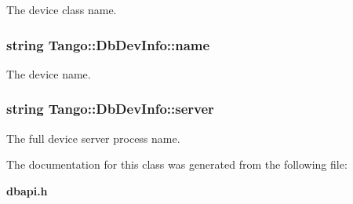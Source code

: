 The device class name. 

\subsubsection[{name}]{\setlength{\rightskip}{0pt plus 5cm}string Tango\-::\-Db\-Dev\-Info\-::name}\label{classTango_1_1DbDevInfo_a4d8d4ec738f75c08e8e8b8a2215b249a}


The device name. 

\subsubsection[{server}]{\setlength{\rightskip}{0pt plus 5cm}string Tango\-::\-Db\-Dev\-Info\-::server}\label{classTango_1_1DbDevInfo_ad890203d5a47fa9c16f9a0475ea17912}


The full device server process name. 



The documentation for this class was generated from the following file\-:\begin{DoxyCompactItemize}
\item 
{\bf dbapi.\-h}\end{DoxyCompactItemize}
